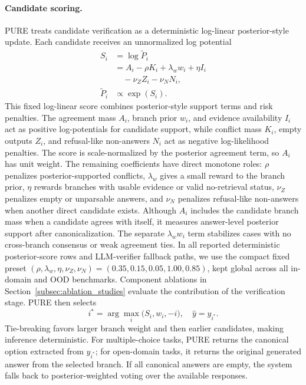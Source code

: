 \documentclass[a4paper,fleqn]{cas-dc}
\begin{document}
\paragraph{Candidate scoring.}
PURE treats candidate verification as a deterministic log-linear posterior-style update. Each candidate receives an unnormalized log potential
\begin{equation}
\label{eq:posterior_verification_score}
\begin{aligned}
S_i
&=\log \tilde{P}_i \\
&=
A_i
-\rho K_i
+\lambda_w w_i
+\eta I_i\\
&\quad
-\nu_Z Z_i
-\nu_N N_i,\\
\tilde{P}_i
&\propto\exp(S_i).
\end{aligned}
\end{equation}
This fixed log-linear score combines posterior-style support terms and risk penalties. The agreement mass $A_i$, branch prior $w_i$, and evidence availability $I_i$ act as positive log-potentials for candidate support, while conflict mass $K_i$, empty outputs $Z_i$, and refusal-like non-answers $N_i$ act as negative log-likelihood penalties. The score is scale-normalized by the posterior agreement term, so $A_i$ has unit weight. The remaining coefficients have direct monotone roles: $\rho$ penalizes posterior-supported conflicts, $\lambda_w$ gives a small reward to the branch prior, $\eta$ rewards branches with usable evidence or valid no-retrieval status, $\nu_Z$ penalizes empty or unparsable answers, and $\nu_N$ penalizes refusal-like non-answers when another direct candidate exists. Although $A_i$ includes the candidate branch mass when a candidate agrees with itself, it measures answer-level posterior support after canonicalization. The separate $\lambda_w w_i$ term stabilizes cases with no cross-branch consensus or weak agreement ties. In all reported deterministic posterior-score rows and LLM-verifier fallback paths, we use the compact fixed preset $(\rho,\lambda_w,\eta,\nu_Z,\nu_N)=(0.35,0.15,0.05,1.00,0.85)$, kept global across all in-domain and OOD benchmarks. Component ablations in Section~\ref{subsec:ablation_studies} evaluate the contribution of the verification stage. PURE then selects
\begin{equation}
\label{eq:posterior_final_selection}
i^*
=
\arg\max_i
\big(S_i,w_i,-i\big),
\quad
\hat{y}=y_{i^*}.
\end{equation}
Tie-breaking favors larger branch weight and then earlier candidates, making inference deterministic. For multiple-choice tasks, PURE returns the canonical option extracted from $y_{i^*}$; for open-domain tasks, it returns the original generated answer from the selected branch. If all canonical answers are empty, the system falls back to posterior-weighted voting over the available responses.
\end{document}
